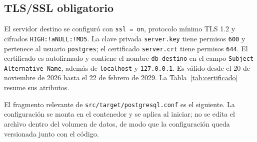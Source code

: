 \subsection{TLS/SSL obligatorio}

El servidor destino se configuró con \texttt{ssl = on}, protocolo mínimo
TLS 1.2 y cifrados \texttt{HIGH:!aNULL:!MD5}. La clave privada
\texttt{server.key} tiene permisos \texttt{600} y pertenece al usuario
\texttt{postgres}; el certificado \texttt{server.crt} tiene permisos
\texttt{644}. El certificado es autofirmado y contiene el nombre
\texttt{db-destino} en el campo \texttt{Subject Alternative Name}, además de
\texttt{localhost} y \texttt{127.0.0.1}. Es válido desde el 20 de noviembre de
2026 hasta el 22 de febrero de 2029. La Tabla~\ref{tab:certificado} resume sus
atributos.

\begin{table}[H]
  \centering
  \caption{Atributos del certificado TLS del destino}
  \label{tab:certificado}
\end{table}

El fragmento relevante de \texttt{src/target/postgresql.conf} es el siguiente.
La configuración se monta en el contenedor y se aplica al iniciar; no se
edita el archivo dentro del volumen de datos, de modo que la configuración
queda versionada junto con el código.

